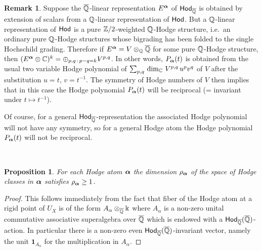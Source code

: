 \documentclass[twoside,leqno]{article}
\numberwithin{equation}{section}
\theoremstyle{plain}
\newtheorem{proposition}[equation]{Proposition}
\theoremstyle{definition}
\newtheorem{remark}[equation]{Remark}
\begin{document}
\begin{remark} \label{rem:weight}
Suppose the $\overline{\mathbb Q}$-linear representation $E^{\boldsymbol{\alpha}}$ of $\mathsf{Hod}_{\overline{\mathbb Q}}$ is obtained by extension of scalars from a $\mathbb Q$-linear representation of $\mathsf{Hod}$.  But a $\mathbb Q$-linear representation of $\mathsf{Hod}$ is a pure $\mathbb Z/2$-weighted $\mathbb Q$-Hodge structure, i.e.\  an ordinary pure  $\mathbb Q$-Hodge structures whose bigrading has been folded to the single Hochschild  grading.  
Therefore if $E^{\boldsymbol{\alpha}} = V\otimes_{\mathbb Q} \overline{\mathbb Q}$ for 
some pure $\mathbb Q$-Hodge structure, then $(E^{\boldsymbol{\alpha}}\otimes \mathbb C)^{k} = \oplus_{p,q\, :\, p-q = k} V^{p,q}$. 
In other words, $P_{\boldsymbol{\alpha}}(t)$ is obtained from the usual two variable  Hodge polynomial of $\sum_{p,q} \, \dim_{\mathbb C} \, V^{p,q} \, u^{p}v^{q}$ of $V$ after the substitution $u = t, \, v = t^{-1}$.
The symmetry of Hodge numbers of $V$ then implies that in this case the Hodge polynomial $P_{\boldsymbol{\alpha}}(t)$ will be reciprocal (= invariant under $t \mapsto t^{-1}$). 

Of course,  for a general $\mathsf{Hod}_{\overline{\mathbb Q}}$-representation the associated  Hodge polynomial will not have any symmetry, so for a general Hodge atom the Hodge polynomial $P_{\boldsymbol{\alpha}}(t)$ will not be reciprocal.
\end{remark}

\

\begin{proposition} \label{prop:Ginv1}
    For each Hodge atom $\boldsymbol{\alpha}$  the dimension $\rho_{\boldsymbol{\alpha}}$  of the space of Hodge classes in $\boldsymbol{\alpha}$ satisfies  $\rho_{\boldsymbol{\alpha}} \ge 1$.
\end{proposition}
\begin{proof}
    This follows immediately from the fact that fiber of the Hodge atom at a rigid point of $U_{X}$ is of the form $A_{\alpha}\otimes_{\overline{\mathbb Q}} \Bbbk$ where 
    $A_{\alpha}$ is a non-zero unital commutative associative superalgebra over $\overline{\mathbb Q}$ which is 
    endowed with a $\mathsf{Hod}_{\overline{\mathbb Q}}(\overline{\mathbb Q})$-action. In particular there is  a non-zero even $\mathsf{Hod}_{\overline{\mathbb Q}}(\overline{\mathbb Q})$-invariant vector, namely the unit $\mathbf{1}_{A_{\alpha}}$ for the multiplication  in $A_{\alpha}$. 
\end{proof}
\end{document}
